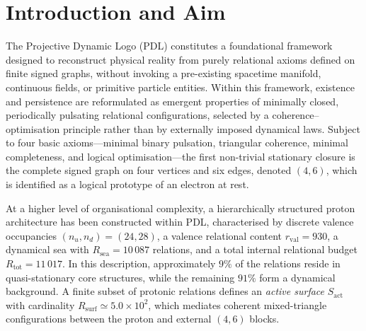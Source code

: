 \documentclass[11pt,a4paper]{article}
\begin{document}
\section{Introduction and Aim}

The Projective Dynamic Logo (PDL) constitutes a foundational framework designed to reconstruct physical reality from purely relational axioms defined on finite signed graphs, without invoking a pre-existing spacetime manifold, continuous fields, or primitive particle entities.\cite{Laubscher2026IntroPDL,Laubscher2026FullPDL}
Within this framework, existence and persistence are reformulated as emergent properties of minimally closed, periodically pulsating relational configurations, selected by a coherence–optimisation principle rather than by externally imposed dynamical laws.\cite{Laubscher2026FullPDL}
Subject to four basic axioms—minimal binary pulsation, triangular coherence, minimal completeness, and logical optimisation—the first non-trivial stationary closure is the complete signed graph on four vertices and six edges, denoted $(4,6)$, which is identified as a logical prototype of an electron at rest.\cite{Laubscher2026IntroPDL,Laubscher2026FullPDL}

At a higher level of organisational complexity, a hierarchically structured proton architecture has been constructed within PDL, characterised by discrete valence occupancies $(n_{u},n_{d})=(24,28)$, a valence relational content $r_{\mathrm{val}}=930$, a dynamical sea with $R_{\mathrm{sea}}=10\,087$ relations, and a total internal relational budget $R_{\mathrm{tot}}=11\,017$.
In this description, approximately $9\%$ of the relations reside in quasi-stationary core structures, while the remaining $91\%$ form a dynamical background.\cite{Laubscher2026FullPDL,Laubscher2026CombinatorialProton}
A finite subset of protonic relations defines an \emph{active surface} $S_{\mathrm{act}}$ with cardinality $R_{\mathrm{surf}}\simeq 5.0\times 10^{2}$, which mediates coherent mixed-triangle configurations between the proton and external $(4,6)$ blocks.\cite{Laubscher2026Alpha}
\end{document}
